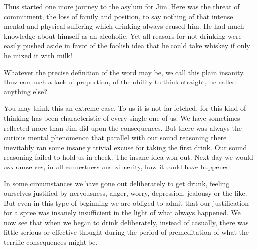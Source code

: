 \begin{biblechapter}
Thus started one more journey to the asylum for Jim. 
Here was the threat of commitment, 
the loss of family and position, 
to say nothing of that intense mental and physical suffering 
which drinking always caused him. 
He had much knowledge about himself as an alcoholic. 
Yet all reasons for not drinking were easily pushed aside 
in favor of the foolish idea that he could take whiskey 
if only he mixed it with milk!
\end{biblechapter}


\begin{biblechapter}

Whatever the precise definition of the word may be, 
we call this plain insanity. 
How can such a lack of proportion, 
of the ability to think straight, 
be called anything else?

You may think this an extreme case. 
To us it is not far-fetched, 
for this kind of thinking has been characteristic of every single one of us. 
We have sometimes reflected more than Jim did upon the consequences. 
But there was always the curious mental phenomenon that parallel with our sound reasoning 
there inevitably ran some insanely trivial excuse for taking the first drink. 
Our sound reasoning failed to hold us in check. 
The insane idea won out. 
Next day we would ask ourselves, in all earnestness and sincerity, how it could have happened.

In some circumstances we have gone out deliberately to get drunk, 
feeling ourselves justified by nervousness, anger, worry, depression, jealousy or the like. 
But even in this type of beginning we are obliged to admit 
that our justification for a spree was insanely insufficient in the light of what always happened. 
We now see that when we began to drink deliberately, instead of casually, 
there was little serious or effective thought during the period of premeditation 
of what the terrific consequences might be.
\end{biblechapter}


